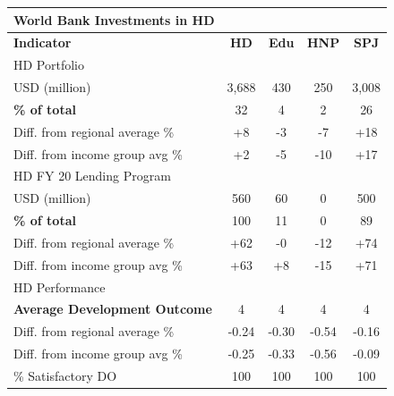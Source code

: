 \documentclass[9.2pt,twocolumn]{article}
\begin{document}
\begin{table}[H]
\small
\begin{tabular}{lcccc}
\textbf{World Bank Investments in HD} & \textbf{} & \textbf{} & \textbf{} & \textbf{} \\ \hline
\textbf{Indicator} & \textbf{HD} & \textbf{Edu} & \textbf{HNP} & \textbf{SPJ} \\ \hline
\cellcolor{iceberg}HD Portfolio & \cellcolor{iceberg} & \cellcolor{iceberg} & \cellcolor{iceberg} & \cellcolor{iceberg} \\ \hline
USD (million) & 3,688 & 430 & 250 & 3,008 \\ 
\textbf{\% of total} & \cellcolor{asparagus} 32 & \cellcolor{arylideyellow} 4 & \cellcolor{arylideyellow} 2 & \cellcolor{asparagus} 26 \\ 
Diff. from regional average \% & +8 & -3 & -7 & +18 \\ 
Diff. from income group avg \% & +2 & -5 & -10 & +17 \\ \hline
\cellcolor{iceberg}HD FY 20 Lending Program & \cellcolor{iceberg} & \cellcolor{iceberg} & \cellcolor{iceberg} & \cellcolor{iceberg} \\ \hline 
USD (million) & 560 & 60 & 0 & 500 \\ 
\textbf{\% of total} & \cellcolor{asparagus} 100 & \cellcolor{asparagus} 11 & \cellcolor{blush} 0 & \cellcolor{asparagus} 89 \\ 
Diff. from regional average \% & +62 & -0 & -12 & +74 \\ 
Diff. from income group avg \% & +63 & +8 & -15 & +71 \\ \hline
\cellcolor{iceberg}HD Performance & \cellcolor{iceberg} & \cellcolor{iceberg} & \cellcolor{iceberg} & \cellcolor{iceberg} \\ \hline
\textbf{Average Development Outcome} & \cellcolor{arylideyellow} 4 & \cellcolor{blush} 4 & \cellcolor{blush} 4 & \cellcolor{arylideyellow} 4 \\ 
Diff. from regional average \% & -0.24 & -0.30 & -0.54 & -0.16 \\ 
Diff. from income group avg \% & -0.25 & -0.33 & -0.56 & -0.09 \\ 
\% Satisfactory DO & 100 & 100 & 100 & 100 \\  \hline

\end{tabular}
\end{table}
\end{document}
